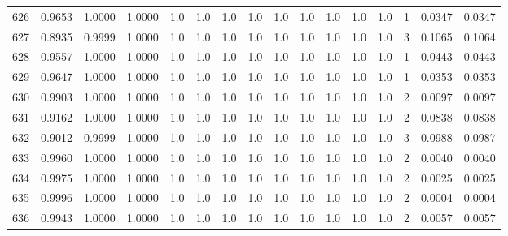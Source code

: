 \begin{tabular}{lrrrrrrrrrrrrrrr}
626 &      0.9653 &  1.0000 &  1.0000 &     1.0 &     1.0 &     1.0 &     1.0 &     1.0 &     1.0 &     1.0 &      1.0 &        1.0 &      1 &                    0.0347 &                     0.0347 \\
627 &      0.8935 &  0.9999 &  1.0000 &     1.0 &     1.0 &     1.0 &     1.0 &     1.0 &     1.0 &     1.0 &      1.0 &        1.0 &      3 &                    0.1065 &                     0.1064 \\
628 &      0.9557 &  1.0000 &  1.0000 &     1.0 &     1.0 &     1.0 &     1.0 &     1.0 &     1.0 &     1.0 &      1.0 &        1.0 &      1 &                    0.0443 &                     0.0443 \\
629 &      0.9647 &  1.0000 &  1.0000 &     1.0 &     1.0 &     1.0 &     1.0 &     1.0 &     1.0 &     1.0 &      1.0 &        1.0 &      1 &                    0.0353 &                     0.0353 \\
630 &      0.9903 &  1.0000 &  1.0000 &     1.0 &     1.0 &     1.0 &     1.0 &     1.0 &     1.0 &     1.0 &      1.0 &        1.0 &      2 &                    0.0097 &                     0.0097 \\
631 &      0.9162 &  1.0000 &  1.0000 &     1.0 &     1.0 &     1.0 &     1.0 &     1.0 &     1.0 &     1.0 &      1.0 &        1.0 &      2 &                    0.0838 &                     0.0838 \\
632 &      0.9012 &  0.9999 &  1.0000 &     1.0 &     1.0 &     1.0 &     1.0 &     1.0 &     1.0 &     1.0 &      1.0 &        1.0 &      3 &                    0.0988 &                     0.0987 \\
633 &      0.9960 &  1.0000 &  1.0000 &     1.0 &     1.0 &     1.0 &     1.0 &     1.0 &     1.0 &     1.0 &      1.0 &        1.0 &      2 &                    0.0040 &                     0.0040 \\
634 &      0.9975 &  1.0000 &  1.0000 &     1.0 &     1.0 &     1.0 &     1.0 &     1.0 &     1.0 &     1.0 &      1.0 &        1.0 &      2 &                    0.0025 &                     0.0025 \\
635 &      0.9996 &  1.0000 &  1.0000 &     1.0 &     1.0 &     1.0 &     1.0 &     1.0 &     1.0 &     1.0 &      1.0 &        1.0 &      2 &                    0.0004 &                     0.0004 \\
636 &      0.9943 &  1.0000 &  1.0000 &     1.0 &     1.0 &     1.0 &     1.0 &     1.0 &     1.0 &     1.0 &      1.0 &        1.0 &      2 &                    0.0057 &                     0.0057 \\

\end{tabular}

